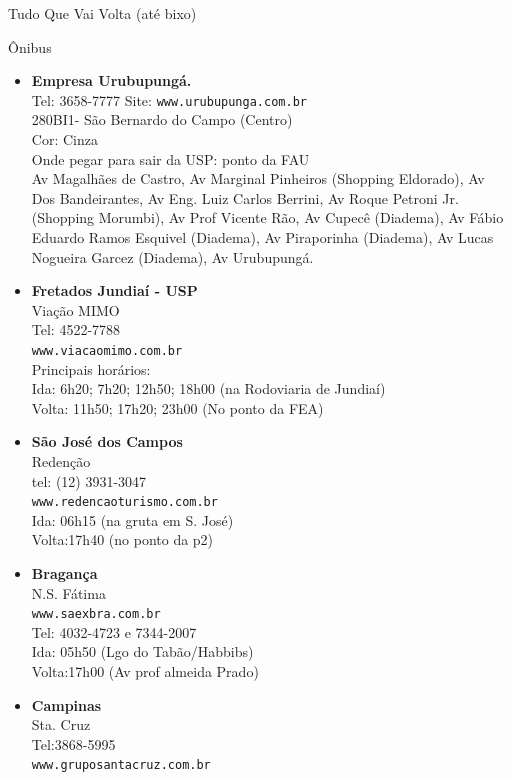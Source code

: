 \begin{secao}{Tudo Que Vai Volta (até bixo)}
\begin{subsecao}{Ônibus}
\begin{itemize}
  \item {\bf Empresa Urubupungá.}\\
    Tel: 3658-7777
    Site: {\tt www.urubupunga.com.br}\\
    280BI1- São Bernardo do Campo (Centro)\\
    Cor: Cinza\\
    Onde pegar para sair da USP: ponto da FAU\\
    Av Magalhães de Castro, Av Marginal Pinheiros (Shopping Eldorado), Av Dos
    Bandeirantes, Av Eng. Luiz Carlos Berrini, Av Roque Petroni Jr. (Shopping
    Morumbi), Av Prof Vicente Rão, Av Cupecê (Diadema), Av Fábio Eduardo Ramos
    Esquivel (Diadema), Av Piraporinha (Diadema), Av Lucas Nogueira Garcez
    (Diadema), Av Urubupungá.

  \item {\bf Fretados Jundiaí - USP}\\
    Viação MIMO\\
    Tel: 4522-7788\\
    {\tt www.viacaomimo.com.br}\\
    Principais horários:\\
    Ida: 6h20; 7h20; 12h50; 18h00 (na Rodoviaria de Jundiaí)\\
    Volta: 11h50; 17h20; 23h00 (No ponto da FEA)

  \item {\bf São José dos Campos}\\
    Redenção\\
    tel: (12) 3931-3047\\
    {\tt www.redencaoturismo.com.br}\\
    Ida: 06h15 (na gruta em S. José)\\
    Volta:17h40 (no ponto da p2)

  \item {\bf Bragança}\\
    N.S. Fátima\\
    {\tt www.saexbra.com.br}\\
    Tel: 4032-4723 e 7344-2007\\
    Ida: 05h50 (Lgo do Tabão/Habbibs)\\
    Volta:17h00 (Av prof almeida Prado)

  \item {\bf Campinas}\\
    Sta. Cruz\\
    Tel:3868-5995\\
    {\tt www.gruposantacruz.com.br}


\end{itemize}
\end{subsecao}
\end{secao}
